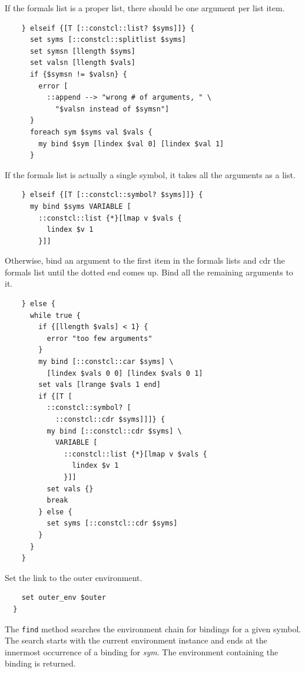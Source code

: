\documentclass[a5paper,draft]{memoir}
\begin{document}
If the formals list is a proper list, there should be one argument per list item.

\begin{lstlisting}
    } elseif {[T [::constcl::list? $syms]]} {
      set syms [::constcl::splitlist $syms]
      set symsn [llength $syms]
      set valsn [llength $vals]
      if {$symsn != $valsn} {
        error [
          ::append --> "wrong # of arguments, " \
            "$valsn instead of $symsn"]
      }
      foreach sym $syms val $vals {
        my bind $sym [lindex $val 0] [lindex $val 1]
      }
\end{lstlisting}

If the formals list is actually a single symbol, it takes all the arguments as a list.

\begin{lstlisting}
    } elseif {[T [::constcl::symbol? $syms]]} {
      my bind $syms VARIABLE [
        ::constcl::list {*}[lmap v $vals {
          lindex $v 1
        }]]
\end{lstlisting}

Otherwise, bind an argument to the first item in the formals lists and cdr the formals list until the dotted end comes up. Bind all the remaining arguments to it.

\begin{lstlisting}
    } else {
      while true {
        if {[llength $vals] < 1} {
          error "too few arguments"
        }
        my bind [::constcl::car $syms] \
          [lindex $vals 0 0] [lindex $vals 0 1]
        set vals [lrange $vals 1 end]
        if {[T [
          ::constcl::symbol? [
            ::constcl::cdr $syms]]]} {
          my bind [::constcl::cdr $syms] \
            VARIABLE [
              ::constcl::list {*}[lmap v $vals {
                lindex $v 1
              }]]
          set vals {}
          break
        } else {
          set syms [::constcl::cdr $syms]
        }
      }
    }
\end{lstlisting}

Set the link to the outer environment.

\begin{lstlisting}
    set outer_env $outer
  }
\end{lstlisting}

The \texttt{find} method searches the environment chain for bindings for a given symbol. The search starts with the current environment instance and ends at the innermost occurrence of a binding for \emph{sym}. The environment containing the binding is returned.
\end{document}
